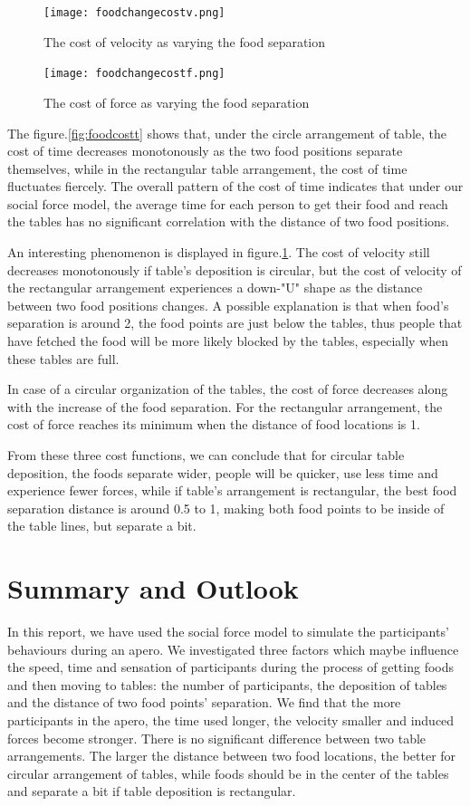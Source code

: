 \documentclass[11pt]{article}
\begin{document}
\begin{figure}[ht!]
\centering
\texttt{[image: foodchangecostv.png]}
\caption{The cost of velocity as varying the food separation}
\label{fig:foodcostv}
\end{figure}

\begin{figure}[ht!]
\centering
\texttt{[image: foodchangecostf.png]}
\caption{The cost of force as varying the food separation}
\label{fig:foodcostf}
\end{figure}
The figure.\ref{fig:foodcostt} shows that, under the circle arrangement of table, the cost of time decreases monotonously as the two food positions separate themselves, while in the rectangular table arrangement, the cost of time fluctuates fiercely. The overall pattern of the cost of time indicates that under our social force model, the average time for each person to get their food and reach the tables has no significant correlation with the distance of two food positions.

An interesting phenomenon is displayed in figure.\ref{fig:foodcostv}. The cost of velocity still decreases monotonously if table's deposition is circular, but the cost of velocity of the rectangular arrangement experiences a down-"U" shape as the distance between two food positions changes. A possible explanation is that when food's separation is around 2, the food points are just below the tables, thus people that have fetched the food will be more likely blocked by the tables, especially when these tables are full.

In case of a circular organization of the tables, the cost of force decreases along with the increase of the food separation. For the rectangular arrangement, the cost of force reaches its minimum when the distance of food locations is 1.

From these three cost functions, we can conclude that for circular table deposition, the foods separate wider, people will be quicker, use less time and experience fewer forces, while if table's arrangement is rectangular, the best food separation distance is around 0.5 to 1, making both food points to be inside of the table lines, but separate a bit.

\section{Summary and Outlook}
In this report, we have used the social force model to simulate the participants' behaviours during an apero. We investigated three factors which maybe influence the speed, time and sensation of participants during the process of getting foods and then moving to tables: the number of participants, the deposition of tables and the distance of two food points' separation. We find that the more participants in the apero, the time used longer, the velocity smaller and induced forces become stronger. There is no significant difference between two table arrangements. The larger the distance between two food locations, the better for circular arrangement of tables, while foods should be in the center of the tables and separate a bit if table deposition is rectangular.
\end{document}
